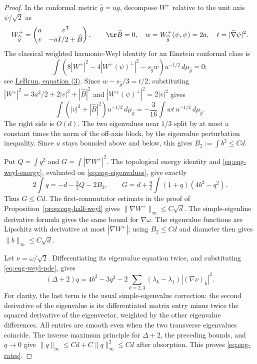 \begin{proof}
In the conformal metric $\widehat g=ug$, decompose $W^+$ relative
to the unit axis $\psi/\sqrt2$ as
\[
 W^+_{\widehat g}=
 \begin{pmatrix}a&v^{\mathsf T}\\v&-aI/2+\widehat B\end{pmatrix},
 \qquad\tr\widehat B=0,
 \quad w=W^+_{\widehat g}(\psi,\psi)=2a,
 \quad t=|\widehat\nabla\psi|^2.
\]
The classical weighted harmonic-Weyl identity for an Einstein
conformal class is
\[
 \int\left(8|W^+|^2
       -4|W^+(\psi)^\perp|^2-s_{\widehat g}w\right)
             u^{-1/2}\,d\mu_{\widehat g}=0;
\]
see \href{https://arxiv.org/pdf/1408.1078}{LeBrun, equation (3)}.
Since $w-s_{\widehat g}/3=t/2$, substituting
$|W^+|^2=3a^2/2+2|v|^2+|\widehat B|^2$ and
$|W^+(\psi)^\perp|^2=2|v|^2$ gives
\begin{equation}\label{eq:eqg-weighted-weyl}
 \int(|v|^2+|\widehat B|^2)u^{-1/2}\,d\mu_{\widehat g}
 =-\frac3{16}\int wt\,u^{-1/2}\,d\mu_{\widehat g}.
\end{equation}
The right side is $O(d)$.  The two eigenvalues near $1/3$ split by
at most a constant times the norm of the off-axis block, by the
eigenvalue perturbation inequality.  Since $u$ stays bounded above
and below, this gives $B_2:=\int b^2\leq Cd$.

Put $Q=\int q^2$ and $G=\int|\nabla W^+|^2$.
The topological energy identity and
\eqref{eq:eqg-weyl-energy}, evaluated on
\eqref{eq:eqg-eigenvalues}, give exactly
\begin{equation}\label{eq:eqg-algebraic-energies}
 2\int q=-d-\tfrac32Q-2B_2,
 \qquad
 G=d+\tfrac92\int(1+q)(4b^2-q^2).
\end{equation}
Thus $G\leq Cd$.  The first-commutator estimate in the proof of
Proposition~\ref{prop:eqg-half-weyl} gives
$\|\nabla W^+\|_\infty\leq C\sqrt d$.
The simple-eigenline derivative formula gives the same bound for
$\nabla\omega$.  The eigenvalue functions are Lipschitz with
derivative at most $|\nabla W^+|$; using $B_2\leq Cd$ and diameter
then gives $\|b\|_\infty\leq C\sqrt d$.

Let $\nu=\omega/\sqrt2$.  Differentiating its eigenvalue equation
twice, and substituting \eqref{eq:eqg-weyl-pde}, gives
\begin{equation}\label{eq:eqg-radial-mass}
 (\Delta+2)q=4b^2-3q^2
       -2\sum_{k=2,3}(\lambda_k-\lambda_1)
                              |(\nabla\nu)_k|^2.
\end{equation}
For clarity, the last term is the usual simple-eigenvalue correction:
the second derivative of the eigenvalue is its differentiated matrix
entry minus twice the squared derivative of the eigenvector, weighted
by the other eigenvalue differences.  All entries are smooth even
when the two transverse eigenvalues coincide.  The inverse maximum
principle for $\Delta+2$, the preceding bounds, and $q\to0$ give
$\|q\|_\infty\leq Cd+C\|q\|_\infty^2\leq Cd$ after absorption.
This proves \eqref{eq:eqg-rates}.


\end{proof}
